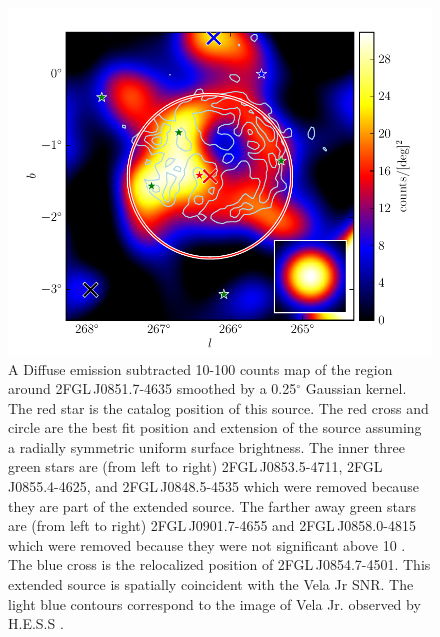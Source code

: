 \documentclass[12pt,preprint]{aastex}
\newcommand{\gev}{\text{GeV}\xspace}
\newcommand{\tev}{\text{TeV}\xspace}
\renewcommand{\deg}{\ensuremath{^\circ}\xspace}
\begin{document}
\begin{figure}
  \begin{center}
    \includegraphics[type=pdf,ext=.pdf,read=.pdf]{source_plots/source_Vela_Jr}
  \end{center}
  \caption{A Diffuse emission subtracted 10-100
  \gev counts map of the region around 2FGL\,J0851.7-4635 smoothed
  by a 0.25\deg Gaussian kernel. The red star is the catalog position of this source.  The red cross
  and circle are the best fit position and extension of the source
  assuming a radially
  symmetric uniform surface brightness.  The inner three green stars
  are (from left to right) 2FGL\,J0853.5-4711, 2FGL\,J0855.4-4625,
  and 2FGL\,J0848.5-4535 which were removed because they are part of
  the extended source.  The farther away green stars are (from left to
  right) 2FGL\,J0901.7-4655 and 2FGL\,J0858.0-4815 which were removed
  because they were not significant above 10 \gev.  The blue cross
  is the relocalized position of 2FGL\,J0854.7-4501.  This extended
  source is spatially coincident with the Vela Jr SNR.  The light
  blue contours correspond to the \tev image of Vela Jr. observed by H.E.S.S
  \citep{vela_jr_hess}.
  }\label{Vela_Jr}
\end{figure}
\end{document}

